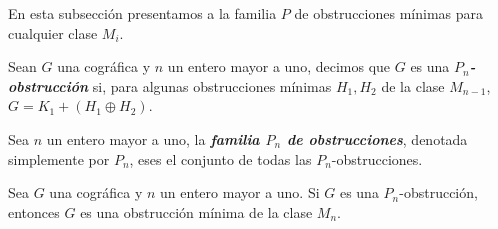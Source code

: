 En esta subsección presentamos a la familia $P$ de obstrucciones mínimas para cualquier clase $M_i$.

Sean $G$ una cográfica y $n$ un entero mayor a uno, decimos que $G$ es una \emph{\textbf{$P_n$-obstrucción}} si, para algunas obstrucciones mínimas $H_1, H_2$ de la clase $M_{n-1}$, $G=K_1+(H_1\oplus H_2)$.

Sea $n$ un entero mayor a uno, la \emph{\textbf{familia $P_n$ de obstrucciones}}, denotada simplemente por $P_n$, eses el conjunto de todas las $P_n$-obstrucciones.

\begin{theorem}
Sea $G$ una cográfica y $n$ un entero mayor a uno. Si $G$ es una $P_n$-obstrucción, entonces $G$ es una obstrucción mínima de la clase $M_n$.
\end{theorem}



